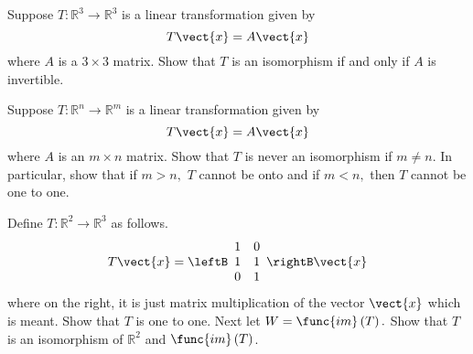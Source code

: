 \begin{enumialphparenastyle}
\begin{ex} Suppose $T:\mathbb{R}^{3}\rightarrow \mathbb{R}^{3}$ is a linear
transformation given by 
\begin{equation*}
T\vect{x}=A\vect{x}
\end{equation*}
where $A$ is a $3\times 3$ matrix. Show that $T$ is an isomorphism if and
only if $A$ is invertible.
\end{ex}


\begin{ex} Suppose $T:\mathbb{R}^{n}\rightarrow \mathbb{R}^{m}$ is a linear
transformation given by 
\begin{equation*}
T\vect{x}=A\vect{x}
\end{equation*}
where $A$ is an $m\times n$ matrix. Show that $T$ is never an isomorphism if 
$m\neq n$. In particular, show that if $m>n,$ $T$ cannot be onto and if $
m<n, $ then $T$ cannot be one to one.
\end{ex}


\begin{ex} Define $T:\mathbb{R}^{2}\rightarrow \mathbb{R}^{3}$ as follows. 
\begin{equation*}
T\vect{x}=\leftB 
\begin{array}{cc}
1 & 0 \\ 
1 & 1 \\ 
0 & 1
\end{array}
\rightB \vect{x}
\end{equation*}
where on the right, it is just matrix multiplication of the vector $\vect{x}$
which is meant. Show that $T$ is one to one. Next let $W=\func{im}\left(
T\right) .$ Show that $T$ is an isomorphism of $\mathbb{R}^{2}$ and $\func{im
}\left( T\right) $.
\end{ex}



\end{enumialphparenastyle}
